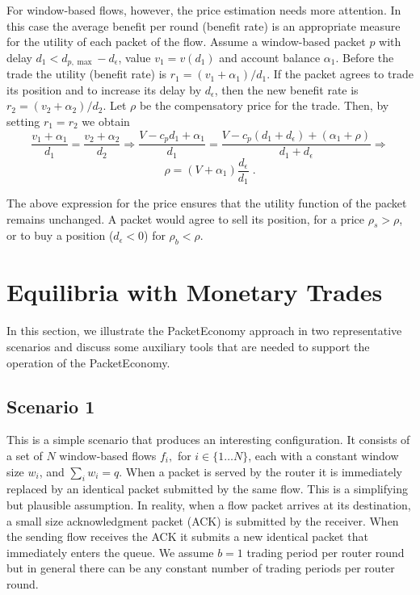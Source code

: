 \documentclass[letterpaper,10pt]{llncs}
\begin{document}
For window-based flows, however, the price estimation needs more attention.
In this case the average benefit per round (benefit rate) is an appropriate measure 
for the utility of each packet of the flow. 
Assume a window-based packet $p$ with delay $d_1 < d_{p,\max} - d_\epsilon$, 
value $v_1 = v(d_1)$ and account balance $\alpha_1$.
Before the trade the utility (benefit rate) is $r_1 = (v_1+\alpha_1)/d_1$. 
If the packet agrees to
trade its position and to increase its delay by $d_\epsilon$, then
the new benefit rate is $r_2 = (v_2+\alpha_2)/d_2$. 
Let $\rho$ be the compensatory price for the trade. Then, by setting $r_1=r_2$ we obtain
\[
\frac{v_1+\alpha_1}{d_1} = \frac{v_2+\alpha_2}{d_2}
\Rightarrow \frac{V - c_p d_1 +\alpha_1}{d_1} = \frac{V - c_p (d_1+d_\epsilon)+(\alpha_1 + \rho)}{d_1+d_\epsilon} \Rightarrow \]
\begin{equation}
\label{equ:priceWindowBased}
 \rho = (V+\alpha_1)\frac{d_\epsilon}{d_1} \; .
\end{equation}

\noindent The above expression for the price ensures that the utility function
of the packet remains unchanged.
A packet would agree to sell its position, for a price $\rho_s > \rho$, or to buy a
position ($d_\epsilon < 0$) for $\rho_b < \rho$. 

\section{Equilibria with Monetary Trades}
\label{sec:scenarios}

\newcommand{\allKN}[1]{\forall #1 \in \mathbb{N}}
\newcommand{\allKX}[2]{\forall #1 \in \{1 \ldots #2 \}}
\newcommand{\allKXS}[3]{\forall #1 \in \{#2 \ldots #3 \}}

In this section, we illustrate the PacketEconomy approach in two representative scenarios
and discuss some auxiliary tools that are needed to support the operation of the PacketEconomy.

\subsection{Scenario 1}
\label{sec:ScenarioNoFiat}
This is a simple scenario that produces an interesting configuration.
It consists of a set of $N$ window-based flows $f_i,$ for $i \in \{1\dots N\}$,
each with a constant window size $w_i$, and $\sum_i w_i = q$.
When a packet is served by the router it is immediately replaced by an identical packet
submitted by the same flow. This is a simplifying but plausible assumption. In reality,
when a flow packet arrives at its destination, a small size acknowledgment packet (ACK) 
is submitted by the receiver. When the sending flow receives the ACK it submits a new
identical packet that immediately enters the queue.
We assume $b=1$ trading period 
per router round but in general there can be any constant number of trading periods per router 
round.
\end{document}
